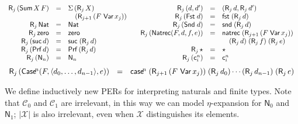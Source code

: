 \documentclass{LMCS}
\theoremstyle{plain}\newtheorem{satz}[thm]{Satz}
\newcommand{\DSum}[2]{\Sigma\,#1\,#2}
\newcommand{\depair}[2]{(#1,#2)}
\newcommand{\dfst}[1]{\mathsf{fst}\;#1}
\newcommand{\dsnd}[1]{\mathsf{snd}\;#1}
\newcommand{\natty}{\mathsf{Nat}}
\newcommand{\ztm}{\mathsf{zero}}
\newcommand{\suctm}[1]{\mathsf{suc}\;#1}
\newcommand{\natrecraw}{\mathsf{natrec}}
\newcommand{\natrec}[4]{\natrecraw\;#1\;#2\;#3\;#4}
\newcommand{\boxty}[1]{[#1]}
\newcommand{\reify}[2]{\mathsf{R}_{#1}\,#2}
\newcommand{\X}{\mathcal{X}}
\newcommand{\smashed}[1]{|#1|}
\newcommand{\iPair}[2]{(#1 , #2)}
\newcommand{\iVar}[1]{\mathsf{Var}\,x_{#1}}
\newcommand{\iDs}[2]{\mathsf{Sum}\,#1\,#2}
\newcommand{\Fst}{\mathsf{Fst}}
\newcommand{\Snd}{\mathsf{Snd}}
\newcommand{\iBoolF}[1]{\Fst\;#1}
\newcommand{\iBoolT}[1]{\Snd\;#1}
\newcommand{\oprf}{\dprf}
\newcommand{\dprf}{\star}
\renewcommand{\boxty}[1]{\mathsf{Prf}\,#1}
\newcommand{\prf}[1]{\mathsf{Prf}\,#1}
\newcommand{\elimraw}{\mathsf{case}}
\newcommand{\Elimraw}{\mathsf{Case}}
\newcommand{\enum}[1]{\mathsf{N}_{#1}}
\newcommand{\elim}[4]{\elimraw\!^{#1}\;#2\;#3\;#4}
\newcommand{\const}[2]{\mathsf{c}^{#1}_{#2}}
\newcommand{\constD}[2]{\mathsf{c}^{#1}_{#2}}
\newcommand{\elimD}[4]{\Elimraw\!^{#1}(#2, #3, #4)}
\newcommand{\enumD}[1]{\mathsf{N}_{#1}}
\newcommand{\tuple}[1]{\langle #1\rangle}
\newcommand{\C}[1]{\ensuremath{\mathcal{C}_{#1}}}
\newcommand{\iZero}{\ztm}
\newcommand{\iNat}{\natty}
\newcommand{\Nrecraw}{\mathsf{Natrec}}
\newcommand{\iNrec}[4]{\Nrecraw(#1,#2,#3,#4)}
\newcommand{\iSuc}[1]{\mathsf{suc}\,#1}
\begin{document}
{\setlength{\originalArrayColSep}{\arraycolsep} 
\setlength\arraycolsep{0.2em}

\begin{defi}\hfill
\[
  \begin{array}[t]{rcl}
    \reify{j}{(\iDs{X}{F})} &=& \DSum{(\reify{j}{X})}{\\ &&\quad(\reify{j+1}{(F\ \iVar{j})})}\\
    \reify{j}{\iNat} &= &\natty \\
    \reify{j}{\iZero} &=& \ztm \\
    \reify{j}{(\iSuc{d})} &=& \suctm{(\reify{j}{d})}\\
    \reify{j}{(\prf{d})}& =& \boxty{(\reify{j}{d})}\\
    \reify{j}{(\enumD{n})} &=& \enum{n}\\
  \end{array}
\quad
\begin{array}[t]{rcl}
    \reify{j}{\iPair{d}{d'}} &=& \depair{\reify{j}{d}}{\reify{j}{d'}} \\
    \reify{j}{(\iBoolF{d})} &=& \dfst{(\reify{j}{d})}\\
    \reify{j}{(\iBoolT{d})} &=& \dsnd{(\reify{j}{d})}\\
    \reify{j}{(\iNrec{F}{d}{f}{e})} &=& \natrec{(\reify{j+1}{(F\;\iVar{j})})}{
      \\ && \quad(\reify{j}{d})}{(\reify{j}{f})}{(\reify{j}{e})}\\
    \reify{j}{\dprf} & = &\oprf \\
    \reify{j}{(\constD{n}{i})} &=& \const{n}{i}\\
  \end{array}
  \]
  \[
  \begin{array}[t]{rcl}
    \reify{j}{(\elimD{n}{F}{\tuple{d_0,\ldots,d_{n-1}}}{e})} &=& 
    \elim{n}{(\reify{j+1}{(F\ \iVar{j})})}{(\reify{j}{d_0})\cdots(\reify{j}{d_{n-1}})}{(\reify{j}{e})}\\
  \end{array}    
  \] 
\end{defi}
\setlength{\arraycolsep}{\originalArrayColSep}



\noindent
We define inductively new PERs for interpreting naturals and finite
types. Note that $\C 0$ and $\C 1$ are irrelevant, in this way we can
model $\eta$-expansion for $\enum{0}$ and $\enum{1}$; $\smashed \X$ is
also irrelevant, even when $\X$ distinguishes its elements.

}
\end{document}
